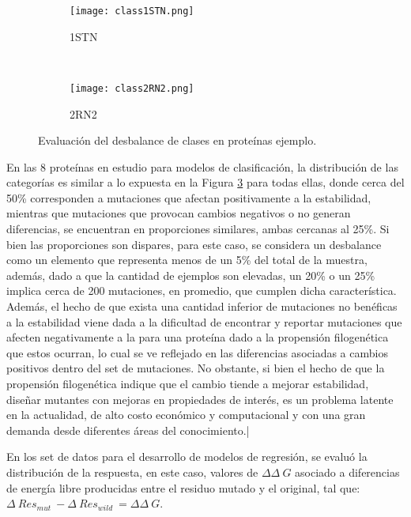 \begin{figure}[!h]
	\centering
	\begin{subfigure}{0.8\textwidth}
		\texttt{[image: class1STN.png]}
		\caption{1STN}
		\label{fig:des1}
	\end{subfigure}
	~ %
	\begin{subfigure}{0.8\textwidth}
		\texttt{[image: class2RN2.png]}
		\caption{2RN2}
		\label{fig:des2}
	\end{subfigure}
	
	\caption{Evaluación del desbalance de clases en proteínas ejemplo.}
	\label{fig:desbalance}
\end{figure}

En las 8 proteínas en estudio para modelos de clasificación, la distribución de las categorías es similar a lo expuesta en la Figura \ref{fig:desbalance} para todas ellas, donde cerca del 50\% corresponden a mutaciones que afectan positivamente a la estabilidad, mientras que mutaciones que provocan cambios negativos o no generan diferencias, se encuentran en proporciones similares, ambas cercanas al 25\%. Si bien las proporciones son dispares, para este caso, se considera un desbalance como un elemento que representa menos de un 5\% del total de la muestra, además, dado a que la cantidad de ejemplos son elevadas, un 20\% o un 25\% implica cerca de 200 mutaciones, en promedio, que cumplen dicha característica. Además, el hecho de que exista una cantidad inferior de mutaciones no benéficas a la estabilidad viene dada a la dificultad de encontrar y reportar mutaciones que afecten negativamente a la para una proteína dado a la propensión filogenética \cite{Olivera-Nappa2011} que estos ocurran, lo cual se ve reflejado en las diferencias asociadas a cambios positivos dentro del set de mutaciones. No obstante, si bien el hecho de que la propensión filogenética indique que el cambio tiende a mejorar estabilidad, diseñar mutantes con mejoras en propiedades de interés, es un problema latente en la actualidad, de alto costo económico y computacional y con una gran demanda desde diferentes áreas del conocimiento.|

En los set de datos para el desarrollo de modelos de regresión, se evaluó la distribución de la respuesta, en este caso, valores de $\Delta\Delta\ G$ asociado a diferencias de energía libre producidas entre el residuo mutado y el original, tal que: $\Delta\ Res_{mut}\ - \Delta\ Res_{wild}\ = \Delta\Delta\ G$. 

